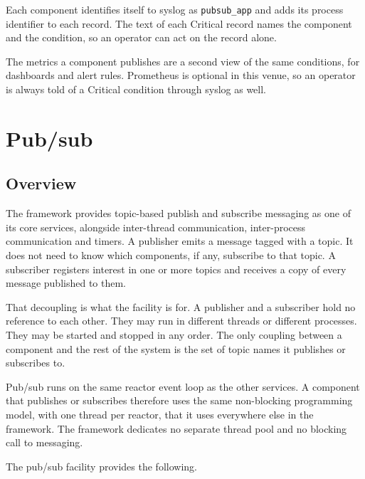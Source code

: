 Each component identifies itself to syslog as \texttt{pubsub\_app} and adds
its process identifier to each record. The text of each Critical record names
the component and the condition, so an operator can act on the record alone.

The metrics a component publishes are a second view of the same conditions,
for dashboards and alert rules. Prometheus is optional in this venue, so an
operator is always told of a Critical condition through syslog as well.

\section{Pub/sub}
\label{sec:pubsub}

\subsection{Overview}

The framework provides topic-based publish and subscribe messaging as one of its
core services, alongside inter-thread communication, inter-process communication
and timers. A publisher emits a message tagged with a topic. It does not need to
know which components, if any, subscribe to that topic. A subscriber registers
interest in one or more topics and receives a copy of every message published to
them.

That decoupling is what the facility is for. A publisher and a subscriber hold
no reference to each other. They may run in different threads or different
processes. They may be started and stopped in any order. The only coupling
between a component and the rest of the system is the set of topic names it
publishes or subscribes to.

Pub/sub runs on the same reactor event loop as the other services. A component
that publishes or subscribes therefore uses the same non-blocking programming
model, with one thread per reactor, that it uses everywhere else in the
framework. The framework dedicates no separate thread pool and no blocking call
to messaging.

The pub/sub facility provides the following.

